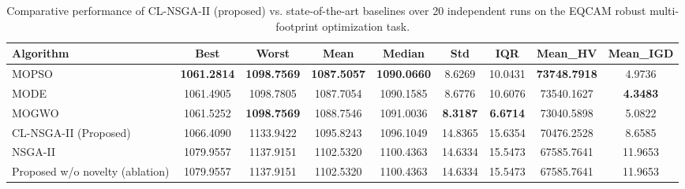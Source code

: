 \begin{table}[ht]
\centering
\caption{Comparative performance of CL-NSGA-II (proposed) vs. state-of-the-art baselines over 20 independent runs on the EQCAM robust multi-footprint optimization task.}
\label{tab:main_results}
\begin{tabular}{lcccccccc}
\toprule
Algorithm & Best & Worst & Mean & Median & Std & IQR & Mean_HV & Mean_IGD \\
\midrule
MOPSO & \textbf{1061.2814} & \textbf{1098.7569} & \textbf{1087.5057} & \textbf{1090.0660} & 8.6269 & 10.0431 & \textbf{73748.7918} & 4.9736 \\
MODE & 1061.4905 & 1098.7805 & 1087.7054 & 1090.1585 & 8.6776 & 10.6076 & 73540.1627 & \textbf{4.3483} \\
MOGWO & 1061.5252 & \textbf{1098.7569} & 1088.7546 & 1091.0036 & \textbf{8.3187} & \textbf{6.6714} & 73040.5898 & 5.0822 \\
CL-NSGA-II (Proposed) & 1066.4090 & 1133.9422 & 1095.8243 & 1096.1049 & 14.8365 & 15.6354 & 70476.2528 & 8.6585 \\
NSGA-II & 1079.9557 & 1137.9151 & 1102.5320 & 1100.4363 & 14.6334 & 15.5473 & 67585.7641 & 11.9653 \\
Proposed w/o novelty (ablation) & 1079.9557 & 1137.9151 & 1102.5320 & 1100.4363 & 14.6334 & 15.5473 & 67585.7641 & 11.9653 \\
\bottomrule
\end{tabular}
\end{table}